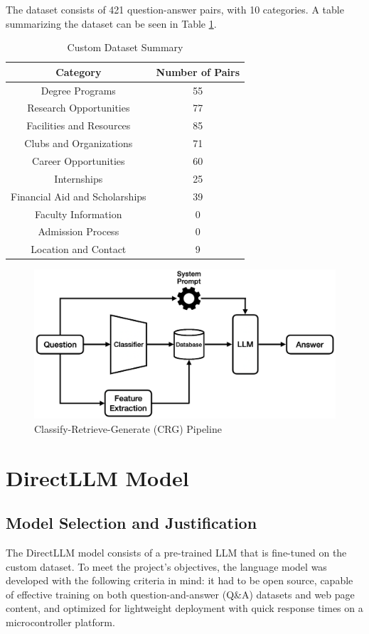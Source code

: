 \documentclass[conference]{IEEEtran}
\begin{document}
The dataset consists of 421 question-answer pairs, with 10 categories.
A table summarizing the dataset can be seen in Table \ref{tab:dataset}.
\begin{table}[h]
    \centering
    \caption{Custom Dataset Summary}
    \begin{tabular}{|c|c|}
        \hline
        \textbf{Category} & \textbf{Number of Pairs} \\ \hline
        Degree Programs & 55 \\ \hline
        Research Opportunities & 77 \\ \hline
        Facilities and Resources & 85 \\ \hline
        Clubs and Organizations & 71 \\ \hline
        Career Opportunities & 60 \\ \hline
        Internships & 25 \\ \hline
        Financial Aid and Scholarships & 39 \\ \hline
        Faculty Information & 0 \\ \hline
        Admission Process & 0 \\ \hline
        Location and Contact & 9 \\ \hline
    \end{tabular}
    \label{tab:dataset}
\end{table}

\begin{figure}[t]
    \centering
    \includegraphics[width=0.60\linewidth]{assets/crg_diagram.png}
    \caption{Classify-Retrieve-Generate (CRG) Pipeline}
    \label{fig:crg_flow}
\end{figure}

\section{DirectLLM Model}
\subsection{Model Selection and Justification}
The DirectLLM model consists of a pre-trained LLM that is fine-tuned on the custom dataset.
To meet the project's objectives, the language model was developed with the following criteria in mind: it had to be open source, capable of effective training on both question-and-answer (Q\&A) datasets and web page content, and optimized for lightweight deployment with quick response times on a microcontroller platform.
\end{document}
